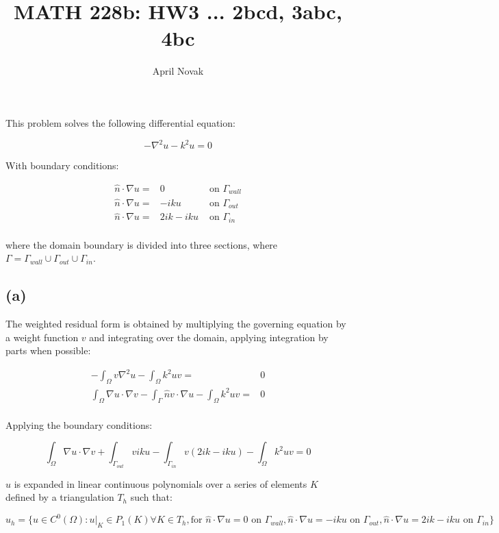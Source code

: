 \documentclass[10pt]{article}
\newcommand{\beq}{\begin{equation}}
\newcommand{\eeq}{\end{equation}}
\newcommand{\beqa}{\begin{equation}\begin{aligned}}
\newcommand{\eeqa}{\end{aligned}\end{equation}}
\begin{document}
\title{MATH 228b: HW3 ... 2bcd, 3abc, 4bc}
\author{April Novak}

\maketitle

\section{}

This problem solves the following differential equation:

\beq
\label{eq:prob}
-\nabla^2 u-k^2u=0
\eeq

With boundary conditions:

\beqa
\label{eq:BCs}
\hat{n}\cdot\nabla u=&0 & \textrm{ on } \Gamma_{wall}\\
\hat{n}\cdot\nabla u=&-iku & \textrm{ on } \Gamma_{out}\\
\hat{n}\cdot\nabla u=&2ik-iku & \textrm{ on } \Gamma_{in}\\
\eeqa

where the domain boundary is divided into three sections, where \(\Gamma=\Gamma_{wall}\cup\Gamma_{out}\cup\Gamma_{in}\). 

\subsection{(a)}

The weighted residual form is obtained by multiplying the governing equation by a weight function \(v\) and integrating over the domain, applying integration by parts when possible:

\beqa
-\int_{\Omega}v\nabla^2 u-\int_{\Omega}k^2uv=& 0\\
\int_{\Omega}\nabla u\cdot\nabla v-\int_{\Gamma}\hat{n}v\cdot\nabla u-\int_{\Omega}k^2uv=&0\\
\eeqa

Applying the boundary conditions:

\beq
\int_{\Omega}\nabla u\cdot\nabla v+\int_{\Gamma_{out}}viku-\int_{\Gamma_{in}}v(2ik-iku)-\int_{\Omega}k^2uv=0
\eeq

\(u\) is expanded in linear continuous polynomials over a series of elements \(K\) defined by a triangulation \(T_h\) such that:

\beq
u_h=\{u\in C^0(\Omega):u\rvert_K\in P_1(K)\forall K\in T_h, \textrm{for } \hat{n}\cdot\nabla u=0 \textrm{ on } \Gamma_{wall}, \hat{n}\cdot\nabla u=-iku \textrm{ on } \Gamma_{out}, \hat{n}\cdot\nabla u=2ik-iku \textrm{ on } \Gamma_{in}\}
\eeq
\end{document}

